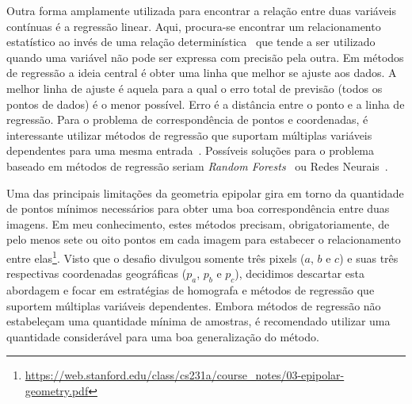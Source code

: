 \documentclass[12pt]{report}
\begin{document}
{%
Outra forma amplamente utilizada para encontrar a relação entre duas variáveis contínuas é a regressão linear.
Aqui, procura-se encontrar um relacionamento estatístico ao invés de uma relação determinística~\cite{seber2012linear} que tende a ser utilizado quando uma variável não pode ser expressa com precisão pela outra.
Em métodos de regressão a ideia central é obter uma linha que melhor se ajuste aos dados. 
A melhor linha de ajuste é aquela para a qual o erro total de previsão (todos os pontos de dados) é o menor possível. 
Erro é a distância entre o ponto e a linha de regressão.
Para o problema de correspondência de pontos e coordenadas, é interessante utilizar métodos de regressão que suportam múltiplas variáveis dependentes para uma mesma entrada~\cite{borchani2015survey}. 
Possíveis soluções para o problema baseado em métodos de regressão seriam \textit{Random Forests}~\cite{correia2016oblique} ou Redes Neurais~\cite{liu2016multispectral}.

Uma das principais limitações da geometria epipolar gira em torno da quantidade de pontos mínimos necessários para obter uma boa correspondência entre duas imagens.
Em meu conhecimento, estes métodos precisam, obrigatoriamente, de pelo menos sete ou oito pontos em cada imagem para estabecer o relacionamento entre elas\footnote{\url{https://web.stanford.edu/class/cs231a/course_notes/03-epipolar-geometry.pdf}}.
Visto que o desafio divulgou somente três pixels ($a$, $b$ e $c$) e suas três respectivas coordenadas geográficas ($p_{a}$, $p_{b}$ e $p_{c}$), decidimos descartar esta abordagem e focar em estratégias de homografa e métodos de regressão que suportem múltiplas variáveis dependentes.
Embora métodos de regressão não estabeleçam uma quantidade mínima de amostras, é recomendado utilizar uma quantidade considerável para uma boa generalização do método.


}
\end{document}

